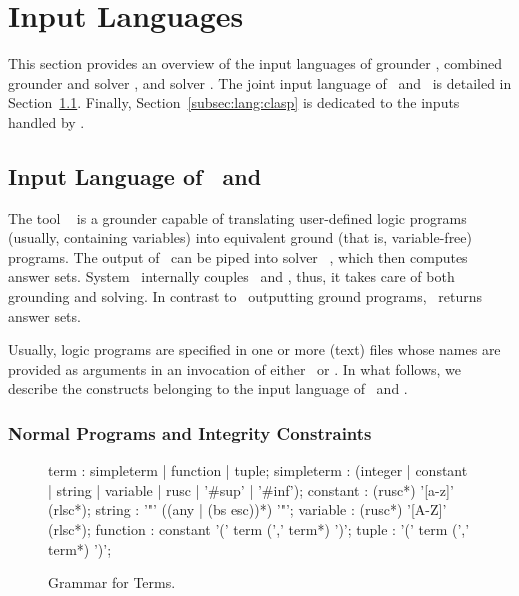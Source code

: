 \section{Input Languages}\label{sec:language}

This section provides an overview of the input languages of
grounder \gringo, combined grounder and solver \clingo,
and %
solver \clasp.
The joint input language of \gringo\ and \clingo\ is detailed in
Section~\ref{subsec:lang:gringo}.
Finally, Section~\ref{subsec:lang:clasp} is dedicated to the inputs handled by \clasp.

\subsection{Input Language of \gringo\ and \clingo}\label{subsec:lang:gringo}

The tool \gringo~\cite{gescth07a} is a grounder capable of translating
user-defined logic programs (usually, containing variables) into
equivalent ground (that is, variable-free) programs.
The output of \gringo\ can be piped into solver \clasp~\cite{gekanesc07a,gekasc09c},
which then computes answer sets.
System \clingo\ internally couples \gringo\ and \clasp, thus,
it takes care of both grounding and solving.
In contrast to \gringo\ outputting ground programs,
\clingo\ returns answer sets.

Usually, logic programs are specified in one or more (text) files whose names are
provided as arguments
in an invocation of either \gringo\ or \clingo.
In what follows, we describe the
constructs belonging to the input language of \gringo\ and \clingo.

\subsubsection{Normal Programs and Integrity Constraints}\label{subsec:gringo:normal}

\begin{figure}
\vspace*{-19mm}
\railnontermfont{\rmfamily\itshape}%
\begin{rail}
  term        : simpleterm | function | tuple;
  simpleterm  : (integer | constant | string | variable | rusc | '\#sup' | '\#inf');
  constant    : (rusc*) '[a-z]' (rlsc*);
  string      : '"' ((any | (bs esc))*) '"';
  variable    : (rusc*) '[A-Z]' (rlsc*);
  function    : constant '(' term (',' term*) ')';
  tuple       :          '(' term (',' term*) ')';
\end{rail}
\caption{Grammar for Terms.\label{fig:terms}}
\end{figure}

